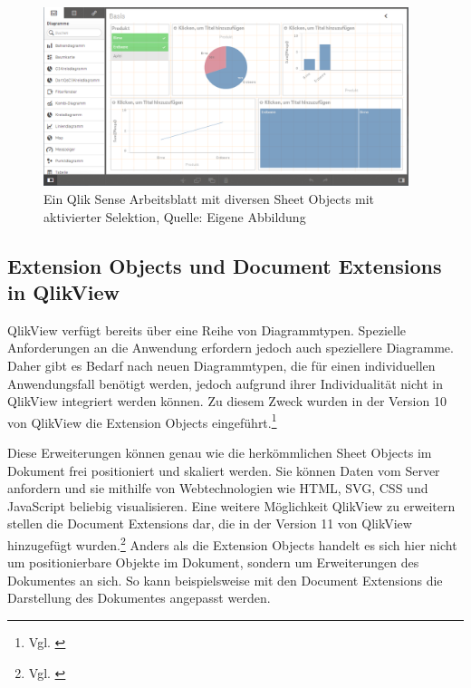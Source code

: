 \begin{figure}[htbp]
	\centering
		\includegraphics[width=0.95\textwidth]{img/QlikView/SheetInSense.png}
	\caption[Ein Qlik Sense Arbeitsblatt mit diversen Sheet Objects mit aktivierter Selektion]{Ein Qlik Sense Arbeitsblatt mit diversen Sheet Objects mit aktivierter Selektion, Quelle: Eigene Abbildung}
	\label{fig:SheetInSense}
\end{figure}






\subsection{Extension Objects und Document Extensions in QlikView}

QlikView verfügt bereits über eine Reihe von Diagrammtypen. Spezielle Anforderungen an die Anwendung erfordern jedoch auch speziellere Diagramme. Daher gibt es Bedarf nach neuen Diagrammtypen, die für einen individuellen Anwendungs\-fall benötigt werden, jedoch aufgrund ihrer Individualität nicht in QlikView integriert werden können. Zu diesem Zweck wurden in der Version 10 von QlikView die Extension Objects eingeführt.\footnote{Vgl. \cite[S. 163]{redmond2013qlikview}}

Diese Erweiterungen können genau wie die herkömmlichen Sheet Objects im Dokument frei positioniert und skaliert werden. Sie können Daten vom Server anfordern und sie mithilfe von Webtechnologien wie HTML, SVG, CSS und JavaScript beliebig visualisieren.
Eine weitere Möglich\-keit QlikView zu erweitern stellen die Document Extensions dar, die in der Version 11 von QlikView hinzugefügt wurden.\footnote{Vgl. \cite[S. 164]{redmond2013qlikview}} Anders als die Extension Objects handelt es sich hier nicht um positionierbare Objekte im Dokument, sondern um Erweiterungen des Dokumentes an sich. So kann beispielsweise mit den Document Extensions die Darstellung des Dokumentes angepasst werden.

